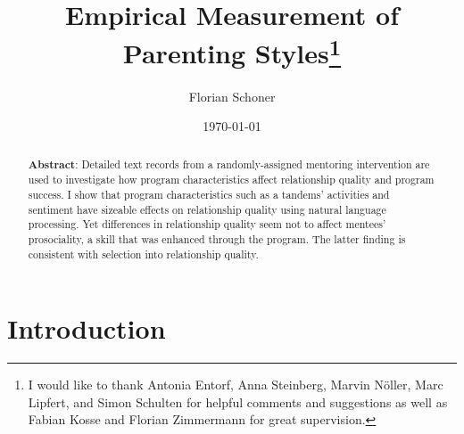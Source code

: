 \documentclass[a4paper,captions=tableheading,12pt]{scrartcl}
\title{Empirical Measurement of Parenting Styles\thanks{I would like to thank Antonia Entorf, Anna Steinberg, Marvin Nöller, Marc Lipfert, and Simon Schulten for helpful comments and suggestions as well as Fabian Kosse and Florian Zimmermann for great supervision.}}
\author{
	\large Florian Schoner
}
\date{\large \today}
\begin{document}
	\maketitle
	\thispagestyle{empty}
	\begin{abstract}
		\noindent\textbf{Abstract}: Detailed text records from a randomly-assigned mentoring intervention are used to investigate how program characteristics affect relationship quality and program success. I show that program characteristics such as a tandems' activities and sentiment have sizeable effects on relationship quality using natural language processing. Yet differences in relationship quality seem not to affect mentees' prosociality, a skill that was enhanced through the program. The latter finding is consistent with selection into relationship quality.
		\bigskip
	\end{abstract}
	\pagebreak
	
	\section{Introduction} \label{sec:intro}
	
	
\end{document}
